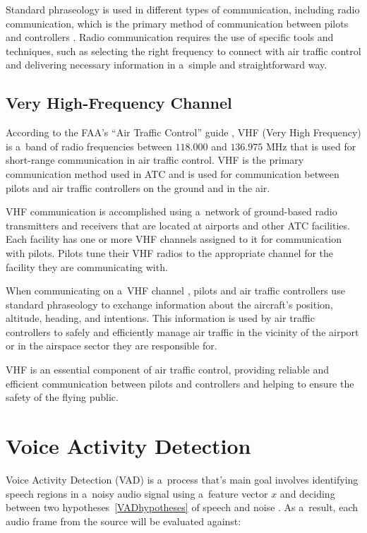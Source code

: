 Standard phraseology is used in different types of communication, including radio communication, which is the primary method of communication between pilots and controllers \cite[ch. 2, pp. 30-31]{ATM:2017}. Radio communication requires the use of specific tools and techniques, such as selecting the right frequency to connect with air traffic control and delivering necessary information in a~simple and straightforward way.


\subsection{Very High-Frequency Channel}\label{VHF}

According to the FAA's ``Air Traffic Control'' guide \cite[p. 573]{faa-atc}, VHF (Very High Frequency) is a~band of radio frequencies between $118.000$ and $136.975$ MHz that is used for short-range communication in air traffic control. VHF is the primary communication method used in ATC and is used for communication between pilots and air traffic controllers on the ground and in the air.

VHF communication is accomplished using a~network of ground-based radio transmitters and receivers that are located at airports and other ATC facilities. Each facility has one or more VHF channels assigned to it for communication with pilots. Pilots tune their VHF radios to the appropriate channel for the facility they are communicating with.

When communicating on a~VHF channel \cite[pp. 53-54]{faa-atc}, pilots and air traffic controllers use standard phraseology to exchange information about the aircraft's position, altitude, heading, and intentions. This information is used by air traffic controllers to safely and efficiently manage air traffic in the vicinity of the airport or in the airspace sector they are responsible for.

VHF is an essential component of air traffic control, providing reliable and efficient communication between pilots and controllers and helping to ensure the safety of the flying public.

\section{Voice Activity Detection}\label{VAD}


Voice Activity Detection (VAD) is a~process that's main goal involves identifying speech regions in a~noisy audio signal using a~feature vector $x$ and deciding between two hypotheses~\ref{VADhypotheses} of speech and noise \cite{Ramirez07}. As a~result, each audio frame from the source will be evaluated against:

